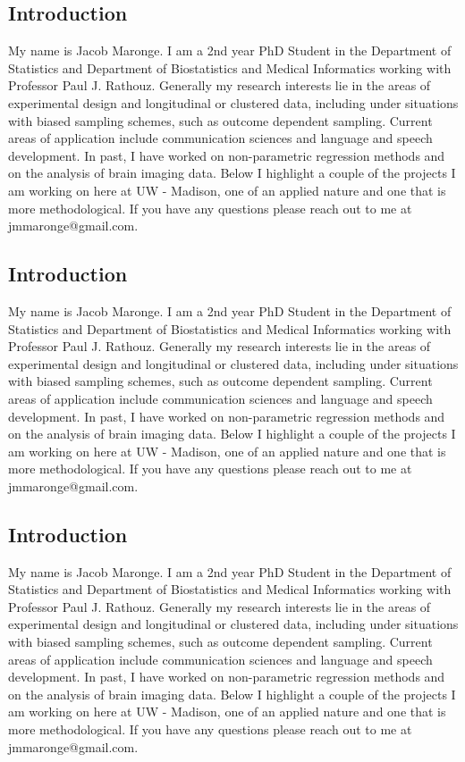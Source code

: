 \documentclass[12pt]{article}
\begin{document}
\begin{multicols}{2}
\subsection*{Introduction}
My name is Jacob Maronge. I am a 2nd year PhD Student in the Department of Statistics and Department of Biostatistics and Medical Informatics working with Professor Paul J. Rathouz. Generally my research interests lie in the areas of experimental design and longitudinal or clustered data, including under situations with biased sampling schemes, such as outcome dependent sampling. Current areas of application include communication sciences and language and speech development. In past, I have worked on non-parametric regression methods and on the analysis of brain imaging data. Below I highlight a couple of the projects I am working on here at UW - Madison, one of an applied nature and one that is more methodological. If you have any questions please reach out to me at jmmaronge@gmail.com.
\subsection*{Introduction}
My name is Jacob Maronge. I am a 2nd year PhD Student in the Department of Statistics and Department of Biostatistics and Medical Informatics working with Professor Paul J. Rathouz. Generally my research interests lie in the areas of experimental design and longitudinal or clustered data, including under situations with biased sampling schemes, such as outcome dependent sampling. Current areas of application include communication sciences and language and speech development. In past, I have worked on non-parametric regression methods and on the analysis of brain imaging data. Below I highlight a couple of the projects I am working on here at UW - Madison, one of an applied nature and one that is more methodological. If you have any questions please reach out to me at jmmaronge@gmail.com.
\subsection*{Introduction}
My name is Jacob Maronge. I am a 2nd year PhD Student in the Department of Statistics and Department of Biostatistics and Medical Informatics working with Professor Paul J. Rathouz. Generally my research interests lie in the areas of experimental design and longitudinal or clustered data, including under situations with biased sampling schemes, such as outcome dependent sampling. Current areas of application include communication sciences and language and speech development. In past, I have worked on non-parametric regression methods and on the analysis of brain imaging data. Below I highlight a couple of the projects I am working on here at UW - Madison, one of an applied nature and one that is more methodological. If you have any questions please reach out to me at jmmaronge@gmail.com.

\end{multicols}
\end{document}

